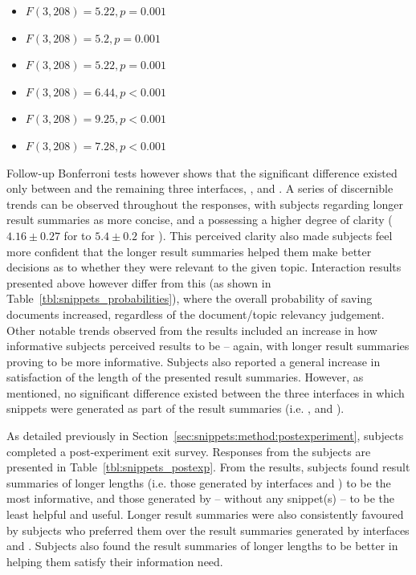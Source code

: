 \begin{itemize}
    \item{ $F(3,208)=5.22, p=0.001$}
    \item{ $F(3,208)=5.2, p=0.001$}
    \item{ $F(3,208)=5.22, p=0.001$}
    \item{ $F(3,208)=6.44, p<0.001$}
    \item{ $F(3,208)=9.25, p<0.001$}
    \item{ $F(3,208)=7.28, p<0.001$}
\end{itemize}

Follow-up Bonferroni tests however shows that the significant difference existed only between  and the remaining three interfaces, ,  and . A series of discernible trends can be observed throughout the responses, with subjects regarding longer result summaries as more concise, and a possessing a higher degree of clarity ($4.16\pm0.27$ for  to $5.4\pm0.2$ for ). This perceived clarity also made subjects feel more confident that the longer result summaries helped them make better decisions as to whether they were relevant to the given topic. Interaction results presented above however differ from this (as shown in Table~\ref{tbl:snippets_probabilities}), where the overall probability of saving documents increased, regardless of the document/topic relevancy judgement. Other notable trends observed from the results included an increase in how informative subjects perceived results to be -- again, with longer result summaries proving to be more informative. Subjects also reported a general increase in satisfaction of the length of the presented result summaries. However, as mentioned, no significant difference existed between the three interfaces in which snippets were generated as part of the result summaries (i.e. ,  and ).

As detailed previously in Section~\ref{sec:snippets:method:postexperiment}, subjects completed a post-experiment exit survey. Responses from the subjects are presented in Table~\ref{tbl:snippets_postexp}. From the results, subjects found result summaries of longer lengths (i.e. those generated by interfaces  and ) to be the most informative, and those generated by  -- without any snippet(s) -- to be the least helpful and useful. Longer result summaries were also consistently favoured by subjects who preferred them over the result summaries generated by interfaces  and . Subjects also found the result summaries of longer lengths to be better in helping them satisfy their information need.

